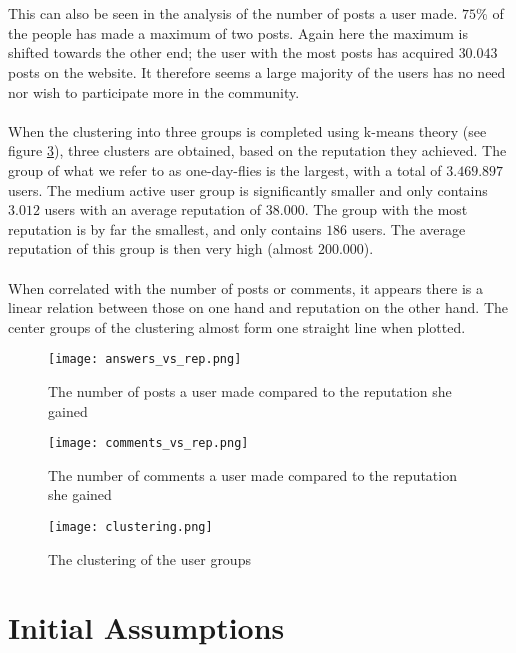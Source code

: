 \documentclass[conference]{IEEEtran}
\begin{document}
\\
\\
This can also be seen in the analysis of the number of posts a user made. $75\%$ of the people has made a maximum of two posts. Again here the maximum is shifted towards the other end; the user with the most posts has acquired $30.043$ posts on the website. It therefore seems a large majority of the users has no need nor wish to participate more in the community.
\\
\\
When the clustering into three groups is completed using k-means theory (see figure \ref{kmeans_clustering}), three clusters are obtained, based on the reputation they achieved. The group of what we refer to as one-day-flies is the largest, with a total of $3.469.897$ users. The medium active user group is significantly smaller and only contains $3.012$ users with an average reputation of $38.000$. The group with the most reputation is by far the smallest, and only contains $186$ users. The average reputation of this group is then very high (almost $200.000$).
\\
\\
When correlated with the number of posts or comments, it appears there is a linear relation between those on one hand and reputation on the other hand. The center groups of the clustering almost form one straight line when plotted.

\begin{figure}[h]
 \texttt{[image: answers\_vs\_rep.png]}
 \caption{The number of posts a user made compared to the reputation she gained}
 \label{answers_vs_rep}
\end{figure}

\begin{figure}[h]
 \texttt{[image: comments\_vs\_rep.png]}
 \caption{The number of comments a user made compared to the reputation she gained}
 \label{comments_vs_rep}
\end{figure}

\begin{figure}[h]
 \texttt{[image: clustering.png]}
 \caption{The clustering of the user groups}
 \label{kmeans_clustering}
\end{figure}


\section{Initial Assumptions}
\label{InitialAssumptions}
\end{document}
